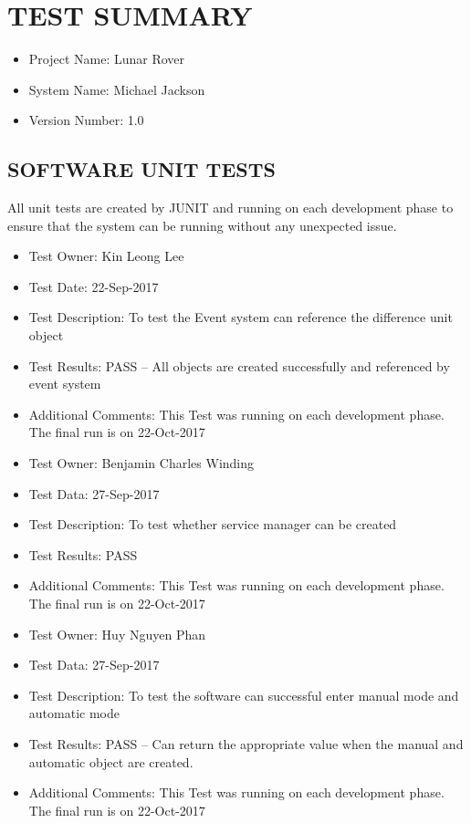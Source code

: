 \documentclass[10pt,a4paper,titlepage]{article}
\begin{document}
	\section{TEST SUMMARY}
\begin{itemize}
\item Project Name:  Lunar Rover
\item System Name: Michael Jackson
\item Version Number: 1.0
\end{itemize}
	\subsection{SOFTWARE UNIT TESTS}
	All unit tests are created by JUNIT and running on each development phase to ensure that the system can be running without any unexpected issue.

	\begin{itemize}
\item Test Owner:  Kin Leong Lee
\item Test Date: 22-Sep-2017
\item Test Description: To test the Event system can reference the difference unit object
\item Test Results: PASS – All objects are created successfully and referenced by event system
\item Additional Comments: This Test was running on each development phase. The final run is on 22-Oct-2017
	\end{itemize}

\begin{itemize}
\item Test Owner: Benjamin Charles Winding
\item Test Data: 27-Sep-2017
\item Test Description: To test whether service manager can be created
\item Test Results: PASS
\item Additional Comments: This Test was running on each development phase. The final run is on 22-Oct-2017
\end{itemize}

\begin{itemize}
\item Test Owner: Huy Nguyen Phan
\item Test Data: 27-Sep-2017
\item Test Description: To test the software can successful enter manual mode and automatic mode
\item Test Results: PASS – Can return the appropriate value when the manual and automatic object are created.
\item Additional Comments: This Test was running on each development phase. The final run is on 22-Oct-2017
\end{itemize}
\end{document}
